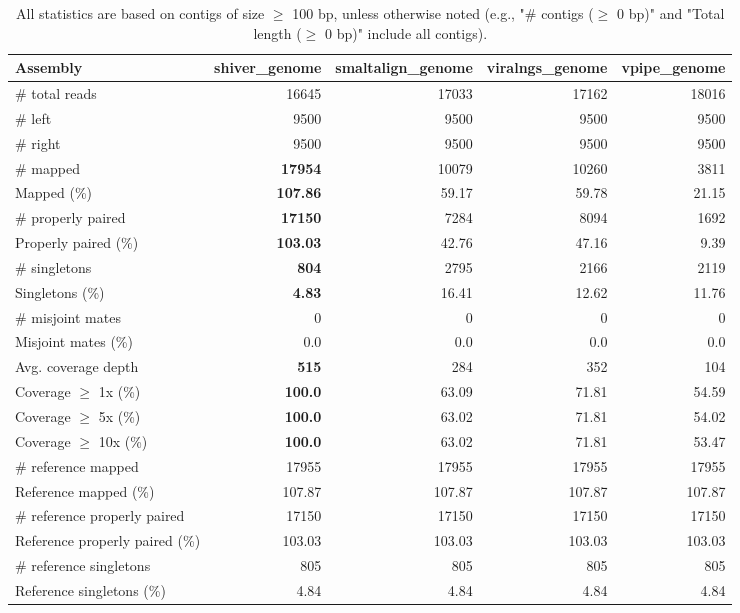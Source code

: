 \documentclass[12pt,a4paper]{article}
\begin{document}
\begin{table}[ht]
\begin{center}
\caption{All statistics are based on contigs of size $\geq$ 100 bp, unless otherwise noted (e.g., "\# contigs ($\geq$ 0 bp)" and "Total length ($\geq$ 0 bp)" include all contigs).}
\begin{tabular}{|l*{4}{|r}|}
\hline
Assembly & shiver\_genome & smaltalign\_genome & viralngs\_genome & vpipe\_genome \\ \hline
\# total reads & 16645 & 17033 & 17162 & 18016 \\ \hline
\# left & 9500 & 9500 & 9500 & 9500 \\ \hline
\# right & 9500 & 9500 & 9500 & 9500 \\ \hline
\# mapped & {\bf 17954} & 10079 & 10260 & 3811 \\ \hline
Mapped (\%) & {\bf 107.86} & 59.17 & 59.78 & 21.15 \\ \hline
\# properly paired & {\bf 17150} & 7284 & 8094 & 1692 \\ \hline
Properly paired (\%) & {\bf 103.03} & 42.76 & 47.16 & 9.39 \\ \hline
\# singletons & {\bf 804} & 2795 & 2166 & 2119 \\ \hline
Singletons (\%) & {\bf 4.83} & 16.41 & 12.62 & 11.76 \\ \hline
\# misjoint mates & 0 & 0 & 0 & 0 \\ \hline
Misjoint mates (\%) & 0.0 & 0.0 & 0.0 & 0.0 \\ \hline
Avg. coverage depth & {\bf 515} & 284 & 352 & 104 \\ \hline
Coverage $\geq$ 1x (\%) & {\bf 100.0} & 63.09 & 71.81 & 54.59 \\ \hline
Coverage $\geq$ 5x (\%) & {\bf 100.0} & 63.02 & 71.81 & 54.02 \\ \hline
Coverage $\geq$ 10x (\%) & {\bf 100.0} & 63.02 & 71.81 & 53.47 \\ \hline
\# reference mapped & 17955 & 17955 & 17955 & 17955 \\ \hline
Reference mapped (\%) & 107.87 & 107.87 & 107.87 & 107.87 \\ \hline
\# reference properly paired & 17150 & 17150 & 17150 & 17150 \\ \hline
Reference properly paired (\%) & 103.03 & 103.03 & 103.03 & 103.03 \\ \hline
\# reference singletons & 805 & 805 & 805 & 805 \\ \hline
Reference singletons (\%) & 4.84 & 4.84 & 4.84 & 4.84 \\ \hline

\end{tabular}
\end{center}
\end{table}
\end{document}
